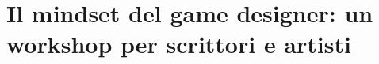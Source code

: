 %
%
%    
%    
%    
%    
%    
%    
%    
%

\chapter[Il mindset del game designer]{Il mindset del game designer: un
workshop per scrittori e artisti}
\label{cap:z6-mindset}

